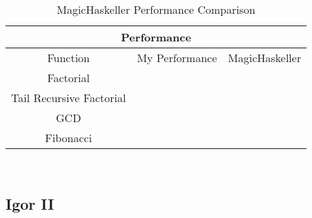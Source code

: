 \begin{table}[h!]
\centering
\begin{tabular}{|c|c|c|}
\hline
\multicolumn{3}{|c|}{\textbf{Performance}}\\
\hline
Function & My Performance & MagicHaskeller \\
\hline
Factorial & & \\
\hline
Tail Recursive Factorial & & \\
\hline
GCD & & \\
\hline
Fibonacci & & \\
\hline
\end{tabular}
\caption{MagicHaskeller Performance Comparison }
\label{table:2}
\end{table}
\mbox{} \\

\subsection{Igor II}
\pagebreak
%
%